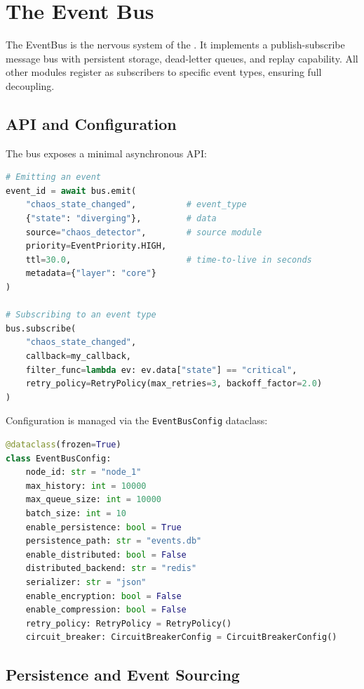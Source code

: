 \section{The Event Bus}

The EventBus is the nervous system of the \Core{}.  It implements a
publish-subscribe message bus with persistent storage, dead-letter queues,
and replay capability.  All other modules register as subscribers to
specific event types, ensuring full decoupling.

\subsection{API and Configuration}

The bus exposes a minimal asynchronous API:

\begin{lstlisting}[language=Python, caption={EventBus core API}]
# Emitting an event
event_id = await bus.emit(
    "chaos_state_changed",          # event_type
    {"state": "diverging"},         # data
    source="chaos_detector",        # source module
    priority=EventPriority.HIGH,
    ttl=30.0,                       # time-to-live in seconds
    metadata={"layer": "core"}
)

# Subscribing to an event type
bus.subscribe(
    "chaos_state_changed",
    callback=my_callback,
    filter_func=lambda ev: ev.data["state"] == "critical",
    retry_policy=RetryPolicy(max_retries=3, backoff_factor=2.0)
)
\end{lstlisting}

Configuration is managed via the \texttt{EventBusConfig} dataclass:

\begin{lstlisting}[language=Python, caption={EventBus configuration}]
@dataclass(frozen=True)
class EventBusConfig:
    node_id: str = "node_1"
    max_history: int = 10000
    max_queue_size: int = 10000
    batch_size: int = 10
    enable_persistence: bool = True
    persistence_path: str = "events.db"
    enable_distributed: bool = False
    distributed_backend: str = "redis"
    serializer: str = "json"
    enable_encryption: bool = False
    enable_compression: bool = False
    retry_policy: RetryPolicy = RetryPolicy()
    circuit_breaker: CircuitBreakerConfig = CircuitBreakerConfig()
\end{lstlisting}

\subsection{Persistence and Event Sourcing}

